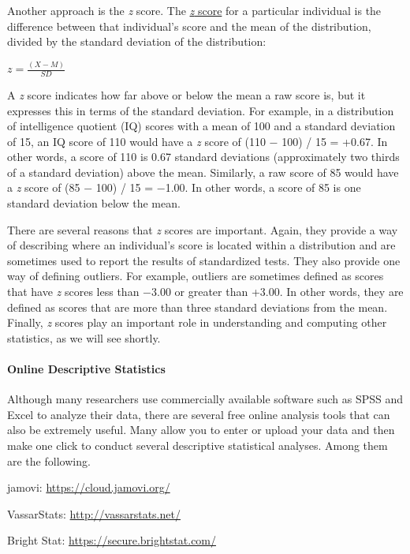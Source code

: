 \documentclass[
]{krantz}
\begin{document}
Another approach is the \emph{z} score. The \hyperref[z-score]{\emph{z} score} for a particular individual is the difference between that individual's score and the mean of the distribution, divided by the standard deviation of the distribution:

\(z=\frac{(X-M)}{SD}\)

A \emph{z} score indicates how far above or below the mean a raw score is, but it expresses this in terms of the standard deviation. For example, in a distribution of intelligence quotient (IQ) scores with a mean of 100 and a standard deviation of 15, an IQ score of 110 would have a \emph{z} score of (110 − 100) / 15 = +0.67. In other words, a score of 110 is 0.67 standard deviations (approximately two thirds of a standard deviation) above the mean. Similarly, a raw score of 85 would have a \emph{z} score of (85 − 100) / 15 = −1.00. In other words, a score of 85 is one standard deviation below the mean.

There are several reasons that \emph{z} scores are important. Again, they provide a way of describing where an individual's score is located within a distribution and are sometimes used to report the results of standardized tests. They also provide one way of defining outliers. For example, outliers are sometimes defined as scores that have \emph{z} scores less than −3.00 or greater than +3.00. In other words, they are defined as scores that are more than three standard deviations from the mean. Finally, \emph{z} scores play an important role in understanding and computing other statistics, as we will see shortly.

\paragraph*{Online Descriptive Statistics}\label{online-descriptive-statistics}

Although many researchers use commercially available software such as SPSS and Excel to analyze their data, there are several free online analysis tools that can also be extremely useful. Many allow you to enter or upload your data and then make one click to conduct several descriptive statistical analyses. Among them are the following.

jamovi: \url{https://cloud.jamovi.org/}

VassarStats: \url{http://vassarstats.net/}

Bright Stat: \url{https://secure.brightstat.com/}
\end{document}
